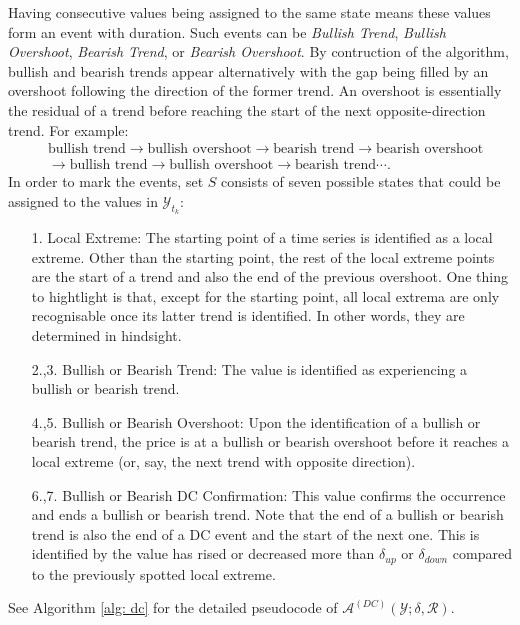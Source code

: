 Having consecutive values being assigned to the same state means these values form an event with duration. Such events can be \textit{Bullish Trend}, \textit{Bullish Overshoot}, \textit{Bearish Trend}, or \textit{Bearish Overshoot}. By contruction of the algorithm, bullish and bearish trends appear alternatively with the gap being filled by an overshoot following the direction of the former trend. An overshoot is essentially the residual of a trend before reaching the start of the next opposite-direction trend. For example:
\begin{align*}
    &\text{bullish trend} \rightarrow \text{bullish overshoot} \rightarrow \text{bearish trend} \rightarrow \text{bearish overshoot} \\
    & \rightarrow \text{bullish trend} \rightarrow \text{bullish overshoot} \rightarrow \text{bearish trend} \cdots.
\end{align*}
In order to mark the events, set $S$ consists of seven possible states that could be assigned to the values in $\mathcal{Y}_{t_k}$:
\begin{enumerate}
    \item[1.] Local Extreme: The starting point of a time series is identified as a local extreme. Other than the starting point, the rest of the local extreme points are the start of a trend and also the end of the previous overshoot. One thing to hightlight is that, except for the starting point, all local extrema are only recognisable once its latter trend is identified. In other words, they are determined in hindsight.
    \item[2.,3.] Bullish or Bearish Trend: The value is identified as experiencing a bullish or bearish trend.
    \item[4.,5.] Bullish or Bearish Overshoot: Upon the identification of a bullish or bearish trend, the price is at a bullish or bearish overshoot before it reaches a local extreme (or, say, the next trend with opposite direction).
    \item[6.,7.] Bullish or Bearish DC Confirmation: This value confirms the occurrence and ends a bullish or bearish trend. Note that the end of a bullish or bearish trend is also the end of a DC event and the start of the next one. This is identified by the value has rised or decreased more than $\delta_{up}$ or $\delta_{down}$ compared to the previously spotted local extreme.
\end{enumerate}
See Algorithm \ref{alg: dc} for the detailed pseudocode of $\mathcal{A}^{(DC)} (\mathcal{Y}; \delta, \mathcal{R})$.
